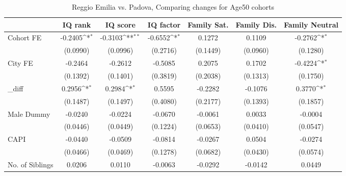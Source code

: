\begin{table}[htbp]\centering
\def\sym#1{\ifmmode^{#1}\else\(^{#1}\)\fi}
\caption{Reggio Emilia vs. Padova, Comparing changes for Age50 cohorts}
\begin{tabular}{l*{6}{c}}
\toprule
            &\multicolumn{1}{c}{IQ rank}&\multicolumn{1}{c}{IQ score}&\multicolumn{1}{c}{IQ factor}&\multicolumn{1}{c}{Family Sat.}&\multicolumn{1}{c}{Family Dis.}&\multicolumn{1}{c}{Family Neutral}\\
\midrule
Cohort FE   &     -0.2405\sym{*}  &     -0.3103\sym{**} &     -0.6552\sym{*}  &      0.1272         &      0.1109         &     -0.2762\sym{*}  \\
            &    (0.0990)         &    (0.0996)         &    (0.2716)         &    (0.1449)         &    (0.0960)         &    (0.1280)         \\
\addlinespace
City FE     &     -0.2464         &     -0.2612         &     -0.5085         &      0.2075         &      0.1702         &     -0.4224\sym{*}  \\
            &    (0.1392)         &    (0.1401)         &    (0.3819)         &    (0.2038)         &    (0.1313)         &    (0.1750)         \\
\addlinespace
\_diff       &      0.2956\sym{*}  &      0.2984\sym{*}  &      0.5595         &     -0.2282         &     -0.1076         &      0.3770\sym{*}  \\
            &    (0.1487)         &    (0.1497)         &    (0.4080)         &    (0.2177)         &    (0.1393)         &    (0.1857)         \\
\addlinespace
Male Dummy  &     -0.0240         &     -0.0224         &     -0.0670         &     -0.0061         &      0.0033         &     -0.0004         \\
            &    (0.0446)         &    (0.0449)         &    (0.1224)         &    (0.0653)         &    (0.0410)         &    (0.0547)         \\
\addlinespace
CAPI        &     -0.0440         &     -0.0509         &     -0.0814         &     -0.0267         &      0.0504         &     -0.0274         \\
            &    (0.0466)         &    (0.0469)         &    (0.1278)         &    (0.0682)         &    (0.0430)         &    (0.0574)         \\
\addlinespace
No. of Siblings&      0.0206         &      0.0110         &     -0.0063         &     -0.0292         &     -0.0142         &      0.0449         \\

\end{tabular}
\end{table}
